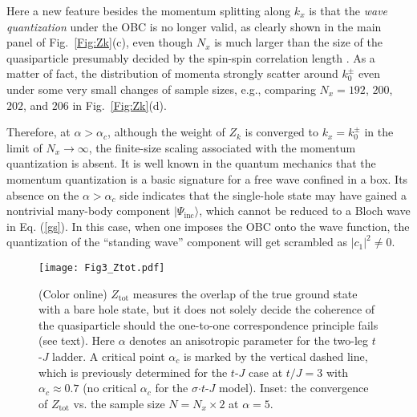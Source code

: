 \documentclass[aps,prb,twocolumn,notitlepage,superscriptaddress,showpacs]{revtex4-1}
\begin{document}
Here a new feature besides the momentum splitting along $k_x$ is that the \emph{wave quantization} under the OBC is no longer valid, as clearly shown in the main panel of Fig.~\ref{Fig:Zk}(c), even though $N_x$ is much larger than the size of the quasiparticle presumably decided by the spin-spin correlation length \cite{ZZ2014qp}.
As a matter of fact, the distribution of momenta strongly scatter around $k_0^{\pm}$ even under some very small changes of sample sizes, e.g., comparing $N_x=192$, $200$, $202$, and $206$ in Fig.~\ref{Fig:Zk}(d).

Therefore, at $\alpha>\alpha_c$, although the weight of $Z_k$ is converged to $k_x=k_0^{\pm}$ in the limit of $N_x\rightarrow \infty$, the finite-size scaling associated with the momentum quantization is absent. It is well known in the quantum mechanics that the momentum quantization is a basic signature for a free wave confined in a box. Its absence on the  $\alpha>\alpha_c$ side indicates that the single-hole state may have gained a nontrivial many-body component $|\Psi_{\mathrm {inc}}\rangle $, which cannot be reduced to a Bloch wave in Eq. (\ref{gs}). In this case, when one imposes the OBC onto the wave function, the quantization of the ``standing wave'' component will get scrambled as $|c_1|^2\neq 0$.

\begin{figure}[tbp]
\begin{center}
\texttt{[image: Fig3\_Ztot.pdf]}
\end{center}
\par
\renewcommand{\figurename}{Fig.}
\caption{(Color online) $Z_{\mathrm{tot}}$ measures the overlap of the true ground state with a bare hole state, but it does not solely decide the coherence of the quasiparticle should the one-to-one correspondence principle fails (see text). Here $\alpha$ denotes an anisotropic parameter for the two-leg $t$-$J$ ladder. A critical point $\alpha_c$ is marked by the vertical dashed line, which is previously determined \cite{ZZ2014qp} for the $t$-$J$ case at $t/J=3$ with $\alpha_c\approx 0.7$ (no critical $\alpha_c$ for the $\sigma$$\cdot$$t$-$J$ model). Inset: the convergence of $Z_{\mathrm{tot}}$ vs. the sample size $N= N_x\times 2$ at $\alpha=5$.  }
\label{Fig1}
\end{figure}
\end{document}
